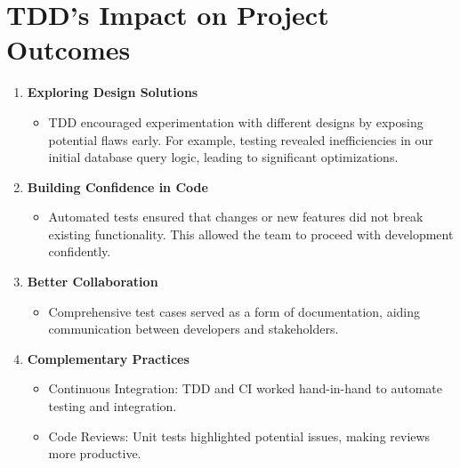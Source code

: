 \documentclass[a4paper,12pt]{article}
\begin{document}
 \section{TDD’s Impact on Project Outcomes}
 \begin{enumerate}
     \item \textbf{Exploring Design Solutions}
         \begin{itemize}
             \item TDD encouraged experimentation with different designs by exposing potential flaws early.
                 For example, testing revealed inefficiencies in our initial database query logic, leading to
                 significant optimizations.
         \end{itemize}
     \item \textbf{Building Confidence in Code}
         \begin{itemize}
             \item Automated tests ensured that changes or new features did not break existing functionality. This allowed the
                 team to proceed with development confidently.
         \end{itemize}
     \item \textbf{Better Collaboration}
         \begin{itemize}
             \item Comprehensive test cases served as a form of documentation, aiding communication between
                 developers and stakeholders.
         \end{itemize}
     \item \textbf{Complementary Practices}
         \begin{itemize}
             \item Continuous Integration: TDD and CI worked hand-in-hand to automate testing and integration.
             \item Code Reviews: Unit tests highlighted potential issues, making reviews more productive.
\end{itemize}
\end{enumerate}
\end{document}
